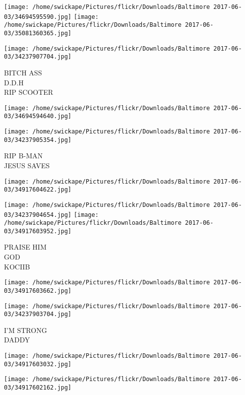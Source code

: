 \documentclass[10pt,letterpaper]{article}
\begin{document}
\texttt{[image: /home/swickape/Pictures/flickr/Downloads/Baltimore 2017-06-03/34694595590.jpg]}
\texttt{[image: /home/swickape/Pictures/flickr/Downloads/Baltimore 2017-06-03/35081360365.jpg]}

\vspace{0.25in}
\texttt{[image: /home/swickape/Pictures/flickr/Downloads/Baltimore 2017-06-03/34237907704.jpg]}

BITCH ASS\\
D.D.H\\
RIP SCOOTER\\
\pagebreak

\texttt{[image: /home/swickape/Pictures/flickr/Downloads/Baltimore 2017-06-03/34694594640.jpg]}

\vspace{0.25in}
\texttt{[image: /home/swickape/Pictures/flickr/Downloads/Baltimore 2017-06-03/34237905354.jpg]}

RIP B{-}MAN\\
JESUS SAVES\\
\pagebreak

\texttt{[image: /home/swickape/Pictures/flickr/Downloads/Baltimore 2017-06-03/34917604622.jpg]}

\vspace{0.25in}
\texttt{[image: /home/swickape/Pictures/flickr/Downloads/Baltimore 2017-06-03/34237904654.jpg]}
\texttt{[image: /home/swickape/Pictures/flickr/Downloads/Baltimore 2017-06-03/34917603952.jpg]}

PRAISE HIM\\
GOD\\
KOCIIB\\
\pagebreak

\texttt{[image: /home/swickape/Pictures/flickr/Downloads/Baltimore 2017-06-03/34917603662.jpg]}

\vspace{0.25in}
\texttt{[image: /home/swickape/Pictures/flickr/Downloads/Baltimore 2017-06-03/34237903704.jpg]}

I'M STRONG\\
DADDY\\
\pagebreak

\texttt{[image: /home/swickape/Pictures/flickr/Downloads/Baltimore 2017-06-03/34917603032.jpg]}

\vspace{0.25in}
\texttt{[image: /home/swickape/Pictures/flickr/Downloads/Baltimore 2017-06-03/34917602162.jpg]}
\end{document}
